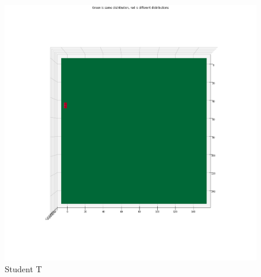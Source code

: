 \clearpage
\begin{figure}[htb]
  \centering
  \includegraphics[width=\linewidth]{./img/hypothesis_test/appendix/naive_student_t.png}
  \caption{Student T}
\end{figure}
\clearpage
